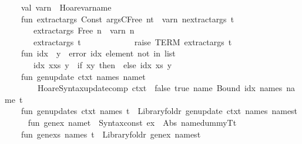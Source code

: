 \begin{isabellebody}
\ \ \ \ val\ varn\ {\isacharequal}\ Hoare{\isachardot}varname{\isacharsemicolon}\isanewline
\isanewline
\ \ \ \ fun\ extract{\isacharunderscore}args\ {\isacharparenleft}Const\ {\isacharparenleft}argsC{\isacharcomma}{\isacharunderscore}{\isacharparenright}{\isachardollar}Free\ {\isacharparenleft}n{\isacharcomma}{\isacharunderscore}{\isacharparenright}{\isachardollar}t{\isacharparenright}\ {\isacharequal}\ varn\ n{\isacharcolon}{\isacharcolon}extract{\isacharunderscore}args\ t\isanewline
\ \ \ \ \ \ {\isacharbar}\ extract{\isacharunderscore}args\ {\isacharparenleft}Free\ {\isacharparenleft}n{\isacharcomma}{\isacharunderscore}{\isacharparenright}{\isacharparenright}\ {\isacharequal}\ {\isacharbrackleft}varn\ n{\isacharbrackright}\isanewline
\ \ \ \ \ \ {\isacharbar}\ extract{\isacharunderscore}args\ t\ \ \ \ \ \ \ \ \ \ \ \ {\isacharequal}\ raise\ TERM\ {\isacharparenleft}{\isachardoublequote}extract{\isacharunderscore}args{\isachardoublequote}{\isacharcomma}\ {\isacharbrackleft}t{\isacharbrackright}{\isacharparenright}\isanewline
\isanewline
\ \ \ \ fun\ idx\ {\isacharbrackleft}{\isacharbrackright}\ y\ {\isacharequal}\ error\ {\isachardoublequote}idx{\isacharcolon}\ element\ not\ in\ list{\isachardoublequote}\isanewline
\ \ \ \ \ {\isacharbar}\ \ idx\ {\isacharparenleft}x{\isacharcolon}{\isacharcolon}xs{\isacharparenright}\ y\ {\isacharequal}\ if\ x{\isacharequal}y\ then\ {}\ else\ {\isacharparenleft}idx\ xs\ y{\isacharparenright}{\isacharplus}{}\isanewline
\isanewline
\ \ \ \ fun\ gen{\isacharunderscore}update\ ctxt\ names\ {\isacharparenleft}name{\isacharcomma}t{\isacharparenright}\ {\isacharequal}\ \isanewline
\ \ \ \ \ \ \ \ Hoare{\isacharunderscore}Syntax{\isachardot}update{\isacharunderscore}comp\ ctxt\ {\isacharbrackleft}{\isacharbrackright}\ false\ true\ name\ {\isacharparenleft}Bound\ {\isacharparenleft}idx\ names\ name{\isacharparenright}{\isacharparenright}\ t\isanewline
\isanewline
\ \ \ \ fun\ gen{\isacharunderscore}updates\ ctxt\ names\ t\ {\isacharequal}\ Library{\isachardot}foldr\ {\isacharparenleft}gen{\isacharunderscore}update\ ctxt\ names{\isacharparenright}\ {\isacharparenleft}names{\isacharcomma}t{\isacharparenright}\ \isanewline
\isanewline
\ \ \ \ fun\ gen{\isacharunderscore}ex\ {\isacharparenleft}name{\isacharcomma}t{\isacharparenright}\ {\isacharequal}\ Syntax{\isachardot}const\ ex\ {\isachardollar}\ Abs\ {\isacharparenleft}name{\isacharcomma}dummyT{\isacharcomma}t{\isacharparenright}\isanewline
\ \isanewline
\ \ \ \ fun\ gen{\isacharunderscore}exs\ names\ t\ {\isacharequal}\ Library{\isachardot}foldr\ gen{\isacharunderscore}ex\ {\isacharparenleft}names{\isacharcomma}t{\isacharparenright}\isanewline

\end{isabellebody}

